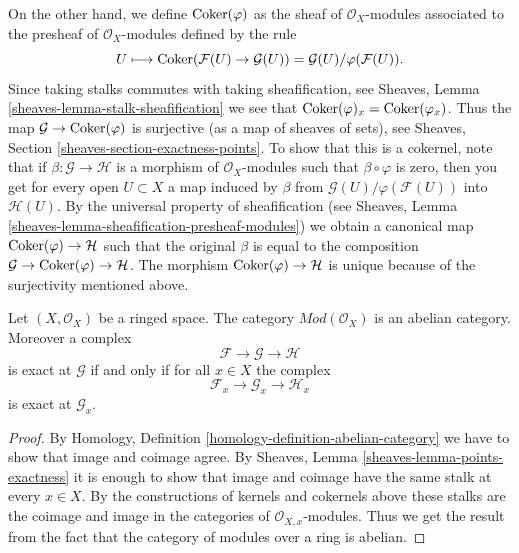 \medskip\noindent
On the other hand, we define
$\mathop{\mathrm{Coker}}(\varphi)$ as the sheaf of $\mathcal{O}_X$-modules
associated to the presheaf of $\mathcal{O}_X$-modules defined
by the rule
$$
U
\longmapsto
\mathop{\mathrm{Coker}}(\mathcal{F}(U)\to \mathcal{G}(U)) =
\mathcal{G}(U)/\varphi(\mathcal{F}(U)).
$$
Since taking stalks commutes with taking sheafification, see
Sheaves, Lemma \ref{sheaves-lemma-stalk-sheafification} we
see that $\mathop{\mathrm{Coker}}(\varphi)_x = \mathop{\mathrm{Coker}}(\varphi_x)$.
Thus the map $\mathcal{G} \to \mathop{\mathrm{Coker}}(\varphi)$ is surjective
(as a map of sheaves of sets),
see Sheaves, Section \ref{sheaves-section-exactness-points}.
To show that this is a cokernel, note that if
$\beta : \mathcal{G} \to \mathcal{H}$ is a morphism of $\mathcal{O}_X$-modules
such that $\beta \circ \varphi$ is zero, then you get for every
open $U \subset X$ a map induced by $\beta$ from
$\mathcal{G}(U)/\varphi(\mathcal{F}(U))$ into $\mathcal{H}(U)$.
By the universal property of sheafification (see
Sheaves, Lemma \ref{sheaves-lemma-sheafification-presheaf-modules})
we obtain a canonical map $\mathop{\mathrm{Coker}}(\varphi) \to \mathcal{H}$
such that the original $\beta$ is equal to
the composition
$\mathcal{G} \to \mathop{\mathrm{Coker}}(\varphi) \to \mathcal{H}$.
The morphism $\mathop{\mathrm{Coker}}(\varphi) \to \mathcal{H}$ is unique
because of the surjectivity mentioned above.

\begin{lemma}
\label{lemma-abelian}
\begin{reference}
\cite[Chapter I, \S 1, nos. 7 and 8, pp. 203--205]{FAC}
\end{reference}
Let $(X, \mathcal{O}_X)$ be a ringed space. The category
$\textit{Mod}(\mathcal{O}_X)$ is an abelian category. Moreover
a complex
$$
\mathcal{F} \to \mathcal{G} \to \mathcal{H}
$$
is exact at $\mathcal{G}$ if and only if for all $x \in X$ the
complex
$$
\mathcal{F}_x \to \mathcal{G}_x \to \mathcal{H}_x
$$
is exact at $\mathcal{G}_x$.
\end{lemma}

\begin{proof}
By Homology, Definition \ref{homology-definition-abelian-category}
we have to show that image and coimage agree. By Sheaves,
Lemma \ref{sheaves-lemma-points-exactness} it is enough to show
that image and coimage have the same stalk at every $x \in X$.
By the constructions of kernels and cokernels above these stalks
are the coimage and image in the categories of $\mathcal{O}_{X, x}$-modules.
Thus we get the result from the fact that the category of modules
over a ring is abelian.
\end{proof}

